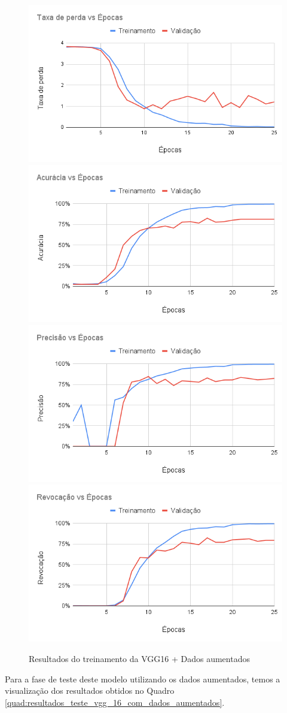 \documentclass[
	12pt,				%
	oneside,			%
	a4paper,			%
	english,			%
	brazil				%
	]{abntex2ppgsi}
\begin{document}
\begin{figure}[H]
    \centering
    \caption{Resultados do treinamento da VGG16 + Dados aumentados}
    \includegraphics[width=.50\textwidth]{imagens/resultados_discussao/architecture/vgg_16/augmented/perda.png}\hfill
    \includegraphics[width=.50\textwidth]{imagens/resultados_discussao/architecture/vgg_16/augmented/acuracia.png}\bigbreak    \includegraphics[width=.50\textwidth]{imagens/resultados_discussao/architecture/vgg_16/augmented/precisao.png}\hfill
    \includegraphics[width=.50\textwidth]{imagens/resultados_discussao/architecture/vgg_16/augmented/revocacao.png}
    \label{fig:vgg_16_dados_aumentados}
\end{figure}

Para a fase de teste deste modelo utilizando os dados aumentados, temos a visualização dos resultados obtidos no Quadro \ref{quad:resultados_teste_vgg_16_com_dados_aumentados}.
\end{document}
